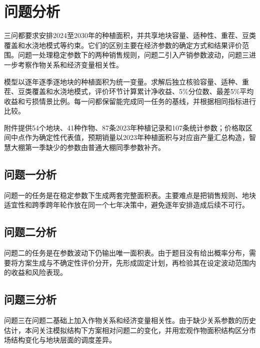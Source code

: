 
\section{问题分析}

三问都要求安排2024至2030年的种植面积，并共享地块容量、适种性、重茬、豆类覆盖和水浇地模式等约束。它们的区别主要在经济参数的确定方式和结果评价范围。问题一处理稳定参数下的两种销售规则，问题二引入产销参数波动，问题三进一步考察作物关系和经济变量相关性。

模型以逐年逐季逐地块的种植面积为统一变量。求解后独立核验容量、适种、重茬、豆类覆盖和水浇地模式，评价环节计算累计净收益、5\%分位数、最差5\%平均收益和亏损情景比例。每一问都保留能完成同一任务的基线，并根据相同指标进行比较。

附件提供54个地块、41种作物、87条2023年种植记录和107条统计参数；价格取区间中点作为确定性代表值，预期销量以2023年种植面积与对应亩产量汇总构造，智慧大棚第一季缺少的参数由普通大棚同季参数补齐。

\subsection{问题一分析}

问题一的任务是在稳定参数下生成两套完整面积表。主要难点是把销售规则、地块适宜性和跨季跨年轮作放在同一个七年决策中，避免逐年安排造成后续不可行。

\subsection{问题二分析}

问题二的任务是在参数波动下仍输出唯一面积表。由于题目没有给出概率分布，需要将方案生成与不确定性评价分开，先形成固定计划，再检验其在设定波动范围内的收益和风险表现。

\subsection{问题三分析}

问题三在问题二基础上加入作物关系和经济变量相关性。由于缺少关系参数的历史估计，本问关注模拟结构下方案相对问题二的变化，并用宏观作物面积结构区分市场结构变化与地块层面的调度差异。
